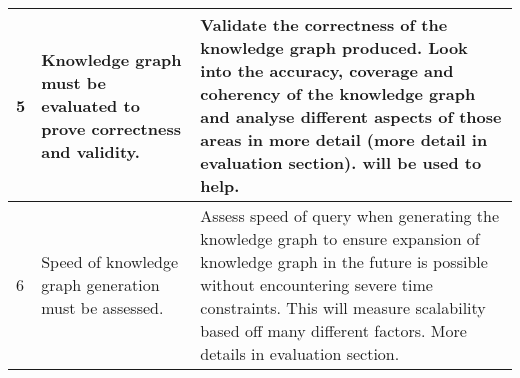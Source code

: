 \begin{longtable}{|p{2.25cm}|p{5.5cm}|p{5.5cm}|}
5&
Knowledge graph must be evaluated to prove correctness and validity. &
Validate the correctness of the knowledge graph produced. Look into the accuracy, coverage and coherency of the knowledge graph and analyse different aspects of those areas in more detail (more detail in evaluation section). \cite{knowledgegraphevaulationbook} will be used to help. \\ 
\hline

6&
Speed of knowledge graph generation must be assessed. &
Assess speed of query when generating the knowledge graph to ensure expansion of knowledge graph in the future is possible without encountering severe time constraints. This will measure scalability based off many different factors. More details in evaluation section. 
\hline
\end{longtable}

